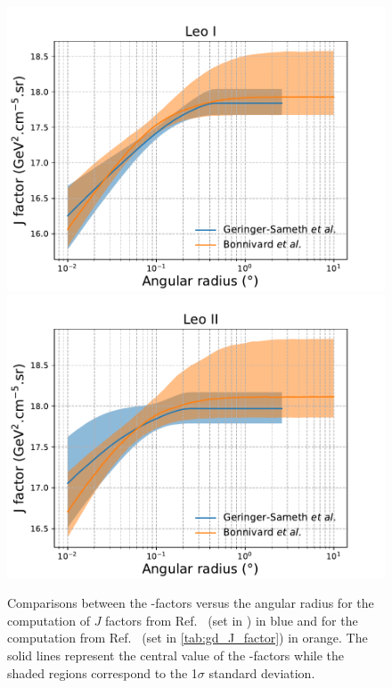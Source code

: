 \begin{figure}[ht]
{    \includegraphics[scale=0.32]{figures/glory_duck/appendix/LeoI.pdf}
    \includegraphics[scale=0.32]{figures/glory_duck/appendix/LeoII.pdf}
    }
    \caption{Comparisons between the \J-factors versus the angular radius for the computation of $J$ factors from Ref.~\cite{Geringer-Sameth:2014yza} (\GS set in ) in blue and for the computation from Ref.~\cite{Bonnivard:2014kza, Bonnivard:2015xpq} (\B set in \cref{tab:gd_J_factor}) in orange. The solid lines represent the central value of the \J-factors while the shaded regions correspond to the 1$\sigma$ standard deviation.}
\label{fig:comparison_J_1}
\end{figure}


